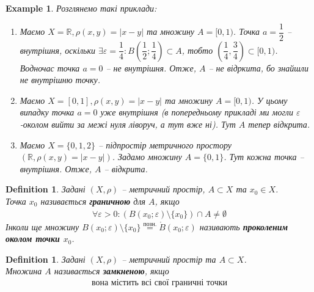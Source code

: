 \documentclass[a4paper, 10pt]{article}
\theoremstyle{theoremdd}
\theoremstyle{theoremdd}
\newtheorem{definition}[theorem]{Definition}
\theoremstyle{theoremdd}
\theoremstyle{theoremdd}
\newtheorem{example}[theorem]{Example}
\theoremstyle{theoremdd}
\theoremstyle{theoremdd}
\theoremstyle{theoremdd}
\theoremstyle{theoremdd}
\begin{document}
\begin{example} 
Розглянемо такі приклади:
\begin{enumerate}[wide=0pt,label={\arabic*)}]
\item Маємо $X = \mathbb{R}, \rho(x,y) = |x-y|$ та множину $A = [0,1)$. Точка $a = \dfrac{1}{2}$ -- внутрішня, оскільки $\exists \varepsilon = \dfrac{1}{4}: B\left(\dfrac{1}{2}; \dfrac{1}{4} \right) \subset A$, тобто $\left( \dfrac{1}{4}, \dfrac{3}{4} \right) \subset [0,1)$. Водночас точка $a = 0$ -- не внутрішня. Отже, $A$ -- не відркита, бо знайшли не внутрішню точку.

\item Маємо $X = [0,1], \rho(x,y) = |x-y|$ та множину $A = [0,1)$. У цьому випадку точка $a = 0$ уже внутрішня (в попередньому прикладі ми могли $\varepsilon$-околом вийти за межі нуля ліворуч, а тут вже ні). Тут $A$ тепер відкрита.

\item Маємо $X = \{0,1,2\}$ -- підпростір метричного простору $(\mathbb{R}, \rho(x,y) = |x-y|)$. Задамо множину $A = \{0,1\}$. Тут кожна точка -- внутрішня. Отже, $A$ -- відкрита.
\end{enumerate}
\end{example}

\begin{definition}
Задані $(X,\rho)$ -- метричний простір, $A \subset X$ та $x_0 \in X$.\\
Точка $x_0$ називається \textbf{граничною} для $A$, якщо
\begin{align*}
\forall \varepsilon > 0: (B(x_0;\varepsilon) \setminus \{x_0\}) \cap A \neq \emptyset
\end{align*}
Інколи ще множину $B(x_0;\varepsilon) \setminus \{x_0\} \overset{\text{позн.}}{=} \mathring{B}(x_0;\varepsilon)$ називають \textbf{проколеним околом точки $x_0$}.
\end{definition}

\begin{definition}
Задані $(X,\rho)$ -- метричний простір та $A \subset X$.\\
Множина $A$ називається \textbf{замкненою}, якщо
\begin{align*}
\text{вона містить всі свої граничні точки}
\end{align*}
\end{definition}
\end{document}
